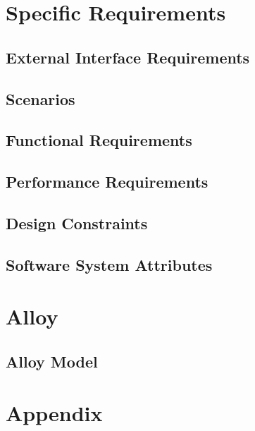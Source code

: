 \documentclass[a4paper,12pt]{report}
\begin{document}
	\chapter{Specific Requirements}
	\label{ch:Specific_Requirements}

	\section{External Interface Requirements}
	

	\section{Scenarios}
	

	\section{Functional Requirements} 
	

	\section{Performance Requirements} 
	

	\section{Design Constraints}
	 
	
	\section{Software System Attributes} 
	


	\chapter{Alloy} 
	\label{ch: alloy}

	\section{Alloy Model}
	

	\appendix
	\chapter{Appendix}
	
	
\end{document}
